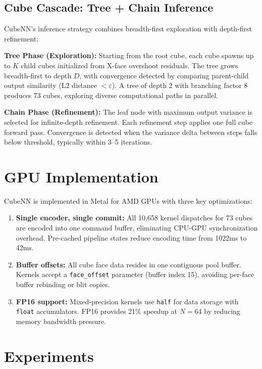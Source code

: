\documentclass{article}
\begin{document}
\subsection{Cube Cascade: Tree + Chain Inference}

CubeNN's inference strategy combines breadth-first exploration with depth-first refinement:

\textbf{Tree Phase (Exploration):} Starting from the root cube, each cube spawns up to $K$ child cubes initialized from X-face overshoot residuals. The tree grows breadth-first to depth $D$, with convergence detected by comparing parent-child output similarity (L2 distance $< \varepsilon$). A tree of depth 2 with branching factor 8 produces 73 cubes, exploring diverse computational paths in parallel.

\textbf{Chain Phase (Refinement):} The leaf node with maximum output variance is selected for infinite-depth refinement. Each refinement step applies one full cube forward pass. Convergence is detected when the variance delta between steps falls below threshold, typically within 3--5 iterations.

\section{GPU Implementation}

CubeNN is implemented in Metal for AMD GPUs with three key optimizations:

\begin{enumerate}
    \item \textbf{Single encoder, single commit:} All 10,658 kernel dispatches for 73 cubes are encoded into one command buffer, eliminating CPU-GPU synchronization overhead. Pre-cached pipeline states reduce encoding time from 1022ms to 42ms.
    \item \textbf{Buffer offsets:} All cube face data resides in one contiguous pool buffer. Kernels accept a \texttt{face\_offset} parameter (buffer index 15), avoiding per-face buffer rebinding or blit copies.
    \item \textbf{FP16 support:} Mixed-precision kernels use \texttt{half} for data storage with \texttt{float} accumulators. FP16 provides 21\% speedup at $N{=}64$ by reducing memory bandwidth pressure.
\end{enumerate}

\section{Experiments}
\end{document}

